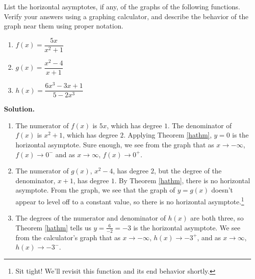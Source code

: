 \begin{ex} \label{haexample} List the horizontal asymptotes, if any, of the graphs of the following functions.  Verify your answers using a graphing calculator, and describe the behavior of the graph near them using proper notation.

\begin{multicols}{3}

\begin{enumerate}

\item $f(x) = \dfrac{5x}{x^2+1}$  

\item  $g(x) = \dfrac{x^2-4}{x+1}$

\item  $h(x) = \dfrac{6x^3-3x+1}{5-2x^3}$

\end{enumerate}

\end{multicols}

{ \bf Solution.}

\begin{enumerate}

\item  The numerator of $f(x)$ is $5x$, which has degree $1$.  The denominator of $f(x)$ is $x^2+1$, which has degree $2$.  Applying Theorem \ref{hathm},  $y=0$ is the horizontal asymptote.  Sure enough, we see from the graph that as $x \rightarrow - \infty$, $f(x) \rightarrow 0^{-}$ and as $x \rightarrow \infty$, $f(x) \rightarrow 0^{+}$.

\item  The numerator of $g(x)$, $x^2-4$, has degree $2$, but the degree of the denominator, $x+1$, has degree $1$.  By Theorem \ref{hathm}, there is no horizontal asymptote.  From the graph, we see that the graph of $y=g(x)$ doesn't appear to level off to a constant value, so there is no horizontal asymptote.\footnote{Sit tight!  We'll revisit this function and its end behavior shortly.}

\item  The degrees of the numerator and denominator of $h(x)$ are both three, so Theorem \ref{hathm} tells us $y = \frac{6}{-2} = -3$ is the horizontal asymptote.  We see from the calculator's graph that as $x \rightarrow -\infty$, $h(x) \rightarrow -3^{+}$, and as $x \rightarrow \infty$, $h(x) \rightarrow -3^{-}$.

\begin{center}


\end{center}
\end{enumerate}
\end{ex}
